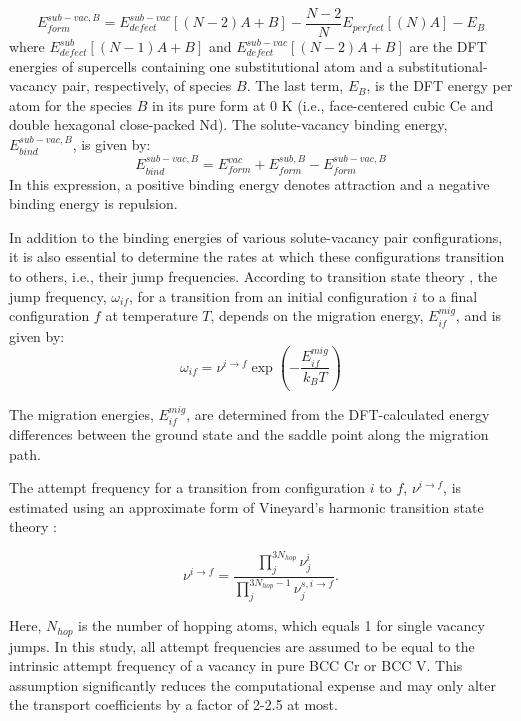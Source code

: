 \documentclass[preprint,12pt]{elsarticle}
\begin{document}
\begin{equation}
\label{eq_Ef_vac_sub}
    E_{form}^{sub-vac,B} = E_{defect}^{sub-vac}[(N-2)A + B] - \frac{N-2}{N}E_{perfect}[(N) A] - E_{B}
\end{equation}
where $E_{defect}^{sub}[(N-1)A + B]$ and $E_{defect}^{sub-vac}[(N-2)A + B]$ are the DFT energies of supercells containing one substitutional atom and a substitutional-vacancy pair, respectively, of species $B$. The last term, $E_{B}$, is the DFT energy per atom for the species $B$ in its pure form at 0 K (i.e., face-centered cubic Ce and double hexagonal close-packed Nd). The solute-vacancy binding energy, $E_{bind}^{sub-vac,B}$, is given by:
\begin{equation}
\label{eq_Eb}
    E_{bind}^{sub-vac,B} = E_{form}^{vac} + E_{form}^{sub,B} - E_{form}^{sub-vac,B}
\end{equation}
In this expression, a positive binding energy denotes attraction and a negative binding energy is repulsion. 

In addition to the binding energies of various solute-vacancy pair configurations, it is also essential to determine the rates at which these configurations transition to others, i.e., their jump frequencies. According to transition state theory \cite{vineyard_frequency_1957}, the jump frequency, $\omega_{if}$, for a transition from an initial configuration $i$ to a final configuration $f$ at temperature $T$, depends on the migration energy, $E_{if}^{mig}$, and is given by:
\begin{equation}
\omega_{if} = \nu^{i\rightarrow f} \exp\left(-\frac{E_{if}^{mig}}{k_BT}\right)
\end{equation}

\noindent The migration energies, $E_{if}^{mig}$, are determined from the DFT-calculated energy differences between the ground state and the saddle point along the migration path. 

The attempt frequency for a transition from configuration $i$ to $f$, $\nu^{i\rightarrow f}$, is estimated using an approximate form of Vineyard's harmonic transition state theory \cite{vineyard_frequency_1957}:

\begin{equation} \nu^{i\rightarrow f} = \frac{\prod_{j}^{3N_{hop}} \nu^{i}_{j}}{\prod_{j}^{3N_{hop}-1} \nu^{s,i\rightarrow f}_j}. \end{equation}

\noindent Here, $N_{hop}$ is the number of hopping atoms, which equals 1 for single vacancy jumps. In this study, all attempt frequencies are assumed to be equal to the intrinsic attempt frequency of a vacancy in pure BCC Cr or BCC V. This assumption significantly reduces the computational expense and may only alter the transport coefficients by a factor of 2-2.5 at most. 
\end{document}
